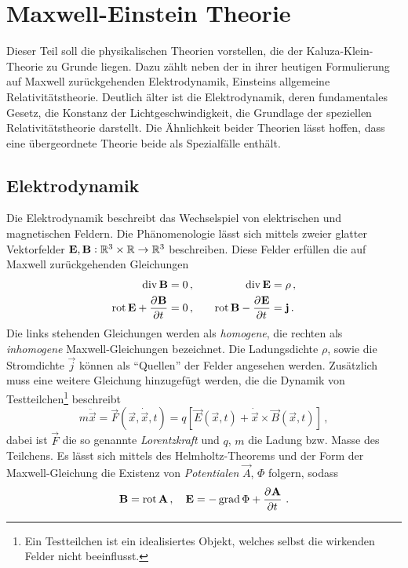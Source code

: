 \chapter{Maxwell-Einstein Theorie}
Dieser Teil soll die physikalischen Theorien vorstellen, die der
Kaluza-Klein-Theorie zu Grunde liegen. Dazu zählt neben der
in ihrer heutigen Formulierung auf Maxwell zurückgehenden
Elektrodynamik, Einsteins allgemeine Relativitätstheorie.
Deutlich älter ist die Elektrodynamik, deren fundamentales Gesetz, die Konstanz
der Lichtgeschwindigkeit, die Grundlage der speziellen Relativitätstheorie
darstellt.
Die Ähnlichkeit beider Theorien lässt hoffen, dass eine
übergeordnete Theorie beide als Spezialfälle enthält.
\section{Elektrodynamik}
Die Elektrodynamik beschreibt das Wechselspiel von elektrischen und
magnetischen Feldern. Die Phänomenologie lässt sich mittels zweier glatter Vektorfelder
${\mathbf{E},\mathbf{B}:\mathbb{R}^3\times\mathbb{R}\to \mathbb{R}^3}$ beschreiben.
Diese Felder erfüllen die auf Maxwell zurückgehenden Gleichungen
\begin{equation}
\begin{alignedat}{2}
\Div\vec{B} &= 0    \,,  & \qquad \Div\vec{E} &= \rho
\,,\\
\Rot\vec{E}+\dpd{\vec{B}}{t}&=0\,,& \qquad\Rot\vec{B}-\dpd{\vec{E}}{t}&
=\vec{j}\,.
\end{alignedat}
\end{equation}
Die links stehenden Gleichungen werden als \emph{homogene}, die rechten als
\emph{inhomogene} Maxwell-Gleichungen bezeichnet. Die Ladungsdichte $\rho$,
sowie die Stromdichte $\vec{j}$ können als "`Quellen"' der Felder angesehen
werden. Zusätzlich muss eine weitere Gleichung hinzugefügt werden, die die
Dynamik von Testteilchen\footnote{Ein Testteilchen ist ein idealisiertes Objekt, welches selbst die wirkenden Felder nicht beeinflusst.} beschreibt
\begin{equation}
m\ddot{\vec{x}}=\vec{F}(\vec{x},\dot{\vec{x}},t)
=q\left[\vec{E}(\vec{x},t)+\dot{\vec{x}}\times\vec{B}(\vec{x},t)\right]\,,
\end{equation}
dabei ist $\vec{F}$ die so genannte \emph{Lorentzkraft} und $q$, $m$ die
Ladung bzw. Masse des Teilchens.
Es lässt sich mittels des Helmholtz-Theorems und der Form der Maxwell-Gleichung
die Existenz von \emph{Potentialen} $\vec{A}$, $\Phi$ folgern, sodass
\begin{equation}
\vec{B}=\Rot \vec{A}\,,\quad
\vec{E}=-\Grad\Phi+\dpd{\vec{A}}{t}\,.\label{eq:Vecpot}
\end{equation}
